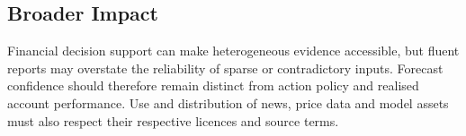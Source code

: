 \subsection{Broader Impact}
Financial decision support can make heterogeneous evidence accessible, but fluent reports may overstate the reliability of sparse or contradictory inputs. Forecast confidence should therefore remain distinct from action policy and realised account performance. Use and distribution of news, price data and model assets must also respect their respective licences and source terms.
